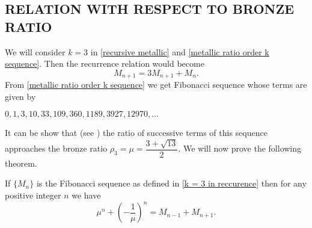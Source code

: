 \documentclass{rmutt-seminar}
\begin{document}
\begin{center}
\subsection*{RELATION WITH RESPECT TO BRONZE RATIO}
\end{center}
We will consider $ k = 3 $ in \eqref{recursive metallic} and \eqref{metallic ratio order k sequence}. Then the recurrence relation would become 
\begin{equation}\label{k = 3 in reccurence}
	 M_{n+1} = 3M_{n+1} + M_n.
\end{equation}  
From \eqref{metallic ratio order k sequence} we get Fibonacci sequence whose terms are given by 
\begin{center}
	$0,1,3,10,33,109,360,1189,3927,12970,\ldots $ 
\end{center}

It can be show that (see \cite{R20}) the ratio of successive terms of this sequence approaches the bronze ratio
$ \rho_{3} = \mu = \dfrac{3 + \sqrt{13}}{2}$. We will now prove the following theorem.
\begin{theorem}\label{bronze ratio theorem}
\textnormal{If} $\bigl\{ M_n \bigr\}$ \textnormal{is the Fibonacci sequence as defined in \eqref{k = 3 in reccurence} then for any positive integer} $ n $ \textnormal{we have} 
\begin{equation}\label{bronze ratio recursive}
	 \mu^n + \left(-\frac{1}{\mu}\right)^n = M_{n-1} + M_{n+1}. 
\end{equation}
\end{theorem}
\end{document}
